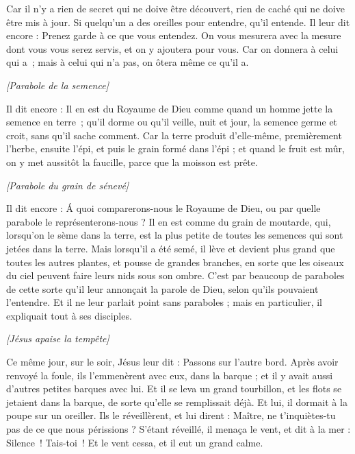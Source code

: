 \begin{multicols}{2}
Car il n'y a rien de secret qui ne doive être découvert, rien de caché qui ne doive être mis à jour.
Si quelqu'un a des oreilles pour entendre, qu'il entende.
Il leur dit encore : Prenez garde à ce que vous entendez. On vous mesurera avec la mesure dont vous vous serez servis, et on y ajoutera pour vous.
Car on donnera à celui qui a ; mais à celui qui n’a pas, on ôtera même ce qu’il a.
\begin{center}
\textit{[Parabole de la semence]}
\end{center}
\PPE{}
Il dit encore : Il en est du Royaume de Dieu comme quand un homme jette la semence en terre ;
qu’il dorme ou qu’il veille, nuit et jour, la semence germe et croit, sans qu'il sache comment.
Car la terre produit d'elle-même, premièrement l'herbe, ensuite l'épi, et puis le grain formé dans l'épi ;
et quand le fruit est mûr, on y met aussitôt la faucille, parce que la moisson est prête.
\begin{center}
\textit{[Parabole du grain de sénevé]}
\end{center}
\PPE{}
Il dit encore : Á quoi comparerons-nous le Royaume de Dieu, ou par quelle parabole le représenterons-nous ?
Il en est comme du grain de moutarde, qui, lorsqu'on le sème dans la terre, est la plus petite de toutes les semences qui sont jetées dans la terre.
Mais lorsqu'il a été semé, il lève et devient plus grand que toutes les autres plantes, et pousse de grandes branches, en sorte que les oiseaux du ciel peuvent faire leurs nids sous son ombre.
C’est par beaucoup de paraboles de cette sorte qu’il leur annonçait la parole de Dieu, selon qu'ils pouvaient l'entendre.
Et il ne leur parlait point sans paraboles ; mais en particulier, il expliquait tout à ses disciples.
\begin{center}
\textit{[Jésus apaise la tempête]}
\end{center}
\PPE{}
Ce même jour, sur le soir, Jésus leur dit : Passons sur l’autre bord.
Après avoir renvoyé la foule, ils l'emmenèrent avec eux, dans la barque ; et il y avait aussi d'autres petites barques avec lui.
Et il se leva un grand tourbillon, et les flots se jetaient dans la barque, de sorte qu'elle se remplissait déjà.
Et lui, il dormait à la poupe sur un oreiller. Ils le réveillèrent, et lui dirent : Maître, ne t’inquiètes-tu pas de ce que nous périssions ?
S’étant réveillé, il menaça le vent, et dit à la mer : Silence ! Tais-toi ! Et le vent cessa, et il eut un grand calme.

\end{multicols}
